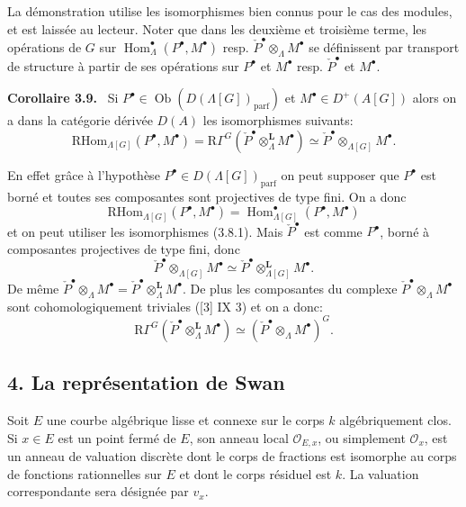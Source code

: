 \documentclass[11pt]{article}
\newenvironment{statement}[1]{\par\medskip\noindent\textbf{#1.}\ }{\par\medskip}
\DeclareMathOperator{\Hom}{Hom}
\newcommand{\R}{\mathrm{R}}\newcommand{\RHomCore}{\mathrm{RHom}}
\providecommand{\RHom}{\RHomCore}
\providecommand{\parf}{\mathrm{parf}}
\providecommand{\RHom}{\RHomCore}
\providecommand{\Hom}{\operatorname{Hom}}
\providecommand{\RHom}{\R\mathcal{H}om}
\providecommand{\R}{\mathrm R}
\providecommand{\parf}{\mathrm{parf}}
\providecommand{\RHom}{\RHomCore}
\providecommand{\Hom}{\operatorname{Hom}}
\begin{document}
La démonstration utilise les isomorphismes bien connus pour le cas des modules, et est laissée au lecteur. Noter que dans les deuxième et troisième terme, les opérations de $G$ sur $\Hom_\Lambda^\bullet(P^\bullet,M^\bullet)$ resp. $\check P^\bullet\otimes_\Lambda M^\bullet$ se définissent par transport de structure à partir de ses opérations sur $P^\bullet$ et $M^\bullet$ resp. $\check P^\bullet$ et $M^\bullet$.

\begin{statement}{Corollaire 3.9}
Si $P^\bullet\in \operatorname{Ob}(D(\Lambda[G])_{\parf})$ et $M^\bullet\in D^+(A[G])$ alors on a dans la catégorie dérivée $D(A)$ les isomorphismes suivants:
\[
\RHom_{\Lambda[G]}(P^\bullet,M^\bullet)
=\R\Gamma^G(\check P^\bullet\otimes_\Lambda^{\mathbf L}M^\bullet)
\simeq \check P^\bullet\otimes_{\Lambda[G]}M^\bullet.
\tag{3.9.1}
\]
\end{statement}

En effet grâce à l'hypothèse $P^\bullet\in D(\Lambda[G])_{\parf}$ on peut supposer que $P^\bullet$ est borné et toutes ses composantes sont projectives de type fini. On a donc
\[
\RHom_{\Lambda[G]}(P^\bullet,M^\bullet)=\Hom_{\Lambda[G]}^\bullet(P^\bullet,M^\bullet)
\]
et on peut utiliser les isomorphismes (3.8.1). Mais $\check P^\bullet$ est comme $P^\bullet$, borné à composantes projectives de type fini, donc
\[
\check P^\bullet\otimes_{\Lambda[G]}M^\bullet\simeq \check P^\bullet\otimes_{\Lambda[G]}^{\mathbf L}M^\bullet.
\]
De même $\check P^\bullet\otimes_\Lambda M^\bullet=\check P^\bullet\otimes_\Lambda^{\mathbf L}M^\bullet$. De plus les composantes du complexe $\check P^\bullet\otimes_\Lambda M^\bullet$ sont cohomologiquement triviales ([3] IX 3) et on a donc:
\[
\R\Gamma^G(\check P^\bullet\otimes_\Lambda^{\mathbf L}M^\bullet)\simeq (\check P^\bullet\otimes_\Lambda M^\bullet)^G.
\]

\subsection*{4. La représentation de Swan}

Soit $E$ une courbe algébrique lisse et connexe sur le corps $k$ algébriquement clos. Si $x\in E$ est un point fermé de $E$, son anneau local $\mathcal O_{E,x}$, ou simplement $\mathcal O_x$, est un anneau de valuation discrète dont le corps de fractions est isomorphe au corps de fonctions rationnelles sur $E$ et dont le corps résiduel est $k$. La valuation correspondante sera désignée par $v_x$.
\end{document}
